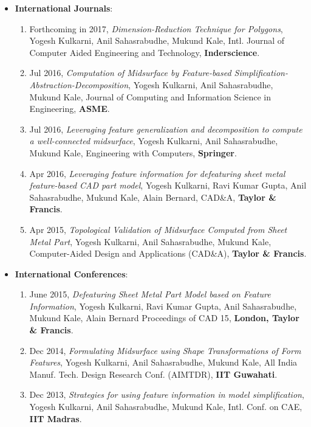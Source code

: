 
\begin{itemize}[noitemsep,label=\textbullet, topsep=2pt,parsep=2pt,partopsep=2pt]
\item  \textbf{International Journals}:
	\begin{enumerate} [noitemsep, topsep=2pt,parsep=2pt,partopsep=2pt]
	\item {Forthcoming in 2017}, \textit{Dimension-Reduction Technique for Polygons}, {Yogesh Kulkarni, Anil Sahasrabudhe, Mukund Kale}, {Intl. Journal of Computer Aided Engineering and Technology}, \textbf{Inderscience}.
	\item 	{Jul 2016}, \textit{Computation of Midsurface by Feature-based Simplification-Abstraction-Decomposition}, {Yogesh Kulkarni, Anil Sahasrabudhe, Mukund Kale}, {Journal of Computing and Information Science in Engineering}, \textbf{ASME}.
	\item 	{Jul 2016}, \textit{Leveraging feature generalization and decomposition to compute a well-connected midsurface}, {Yogesh Kulkarni, Anil Sahasrabudhe, Mukund Kale}, {Engineering with Computers}, \textbf{Springer}.
	\item 	{Apr 2016}, \textit{Leveraging feature information for defeaturing sheet metal feature-based CAD part model}, {Yogesh Kulkarni, Ravi Kumar Gupta, Anil Sahasrabudhe, Mukund Kale, Alain Bernard}, {CAD\&A}, \textbf{Taylor \& Francis}.
	\item 	{Apr 2015}, \textit{Topological Validation of Midsurface Computed from Sheet Metal Part}, {Yogesh Kulkarni, Anil Sahasrabudhe, Mukund Kale}, {Computer-Aided Design and Applications (CAD\&A)}, \textbf{Taylor \& Francis}.	
	\end{enumerate}
\item  \textbf{International Conferences}:
	\begin{enumerate}[noitemsep, topsep=2pt,parsep=2pt,partopsep=2pt]
	\item 	{June 2015}, \textit{Defeaturing Sheet Metal Part Model based on Feature Information}, {Yogesh Kulkarni, Ravi Kumar Gupta, Anil Sahasrabudhe, Mukund Kale, Alain Bernard} {Proceedings of CAD 15}, \textbf{London, Taylor \& Francis}.
	\item 	{Dec 2014}, \textit{Formulating Midsurface using Shape Transformations of Form Features},	{Yogesh Kulkarni, Anil Sahasrabudhe, Mukund Kale}, {All India Manuf. Tech. Design Research Conf. (AIMTDR)}, \textbf{IIT Guwahati}.
	\item  	{Dec 2013}, \textit{Strategies for using feature information in model simplification}, {Yogesh Kulkarni, Anil Sahasrabudhe, Mukund Kale}, {Intl. Conf. on CAE}, \textbf{IIT Madras}.	

\end{enumerate}
\end{itemize}
